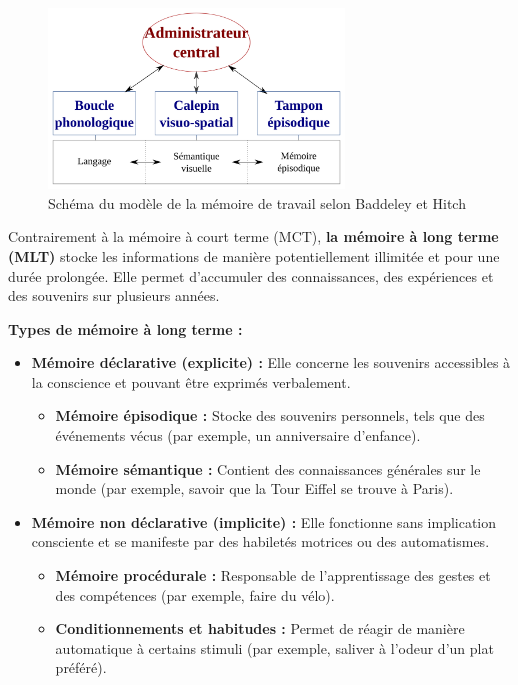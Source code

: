 \documentclass[12pt,a4paper]{report}
\begin{document}
\begin{figure}[h]
    \centering
    \includegraphics[width=0.7\textwidth]{images/modele_baddeley_hitch.png}
    \caption{Schéma du modèle de la mémoire de travail selon Baddeley et Hitch}
    \label{fig:baddeley}
\end{figure}

\newpage
Contrairement à la mémoire à court terme (MCT), \textbf{la mémoire à long terme (MLT)} stocke les informations de manière potentiellement illimitée et pour une durée prolongée. Elle permet d'accumuler des connaissances, des expériences et des souvenirs sur plusieurs années.

\textbf{Types de mémoire à long terme :}
\begin{itemize}
    \item \textbf{Mémoire déclarative (explicite) :} Elle concerne les souvenirs accessibles à la conscience et pouvant être exprimés verbalement.
    \begin{itemize}
        \item \textbf{Mémoire épisodique :} Stocke des souvenirs personnels, tels que des événements vécus (par exemple, un anniversaire d'enfance).
        \item \textbf{Mémoire sémantique :} Contient des connaissances générales sur le monde (par exemple, savoir que la Tour Eiffel se trouve à Paris).
    \end{itemize}
    \item \textbf{Mémoire non déclarative (implicite) :} Elle fonctionne sans implication consciente et se manifeste par des habiletés motrices ou des automatismes.
    \begin{itemize}
        \item \textbf{Mémoire procédurale :} Responsable de l'apprentissage des gestes et des compétences (par exemple, faire du vélo).
        \item \textbf{Conditionnements et habitudes :} Permet de réagir de manière automatique à certains stimuli (par exemple, saliver à l'odeur d'un plat préféré).
    \end{itemize}
\end{itemize}
\end{document}
